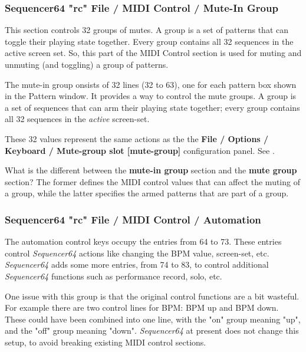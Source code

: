 \subsubsection{Sequencer64 "rc" File / MIDI Control / Mute-In Group}
\label{subsubsec:seq64_rc_file_midi_ctrl_mutein}

   This section controls 32 groups of mutes.
   A group is a set of patterns that can toggle their playing state
   together.  Every group contains all 32 sequences in the active screen set.
   So, this part of the MIDI Control section is used for muting and unmuting
   (and toggling) a group of patterns.

   The mute-in group onsists of 32 lines (32 to 63), one for each
   pattern box shown in the Pattern window.
   It provides a way to control the mute groups.
   A group is a set of sequences that can arm their playing state
   together; every group contains all 32 sequences in the
   \textsl{active} screen-set.

   These 32 values represent the same actions as the
   the \textbf{File / Options / Keyboard / Mute-group slot [mute-group]} 
   configuration panel.
   See .

   What is the different between the \textbf{mute-in group}
   section and the \textbf{mute group} section?  The former defines the MIDI
   control values that can affect the muting of a group, while the latter
   specifies the armed patterns that are part of a group.

\subsubsection{Sequencer64 "rc" File / MIDI Control / Automation}
\label{subsubsec:seq64_rc_file_midi_ctrl_automation}

   The automation control keys occupy the entries from 64 to 73.
   These entries control
   \textsl{Sequencer64} actions like changing the BPM value, screen-set, etc.
   \textsl{Sequencer64} adds some more entries, from 74 to 83, to control
   additional \textsl{Sequencer64} functions such as performance
   record, solo, etc.
   
   One issue with this group is that the original control functions are a bit
   wasteful.  For example there are two control lines for BPM:  BPM up and BPM
   down.  These could have been combined into one line, with the "on" group
   meaning "up", and the "off" group meaning "down".  
   \textsl{Sequencer64} at present does not change this setup, to avoid
   breaking existing MIDI control sections.

